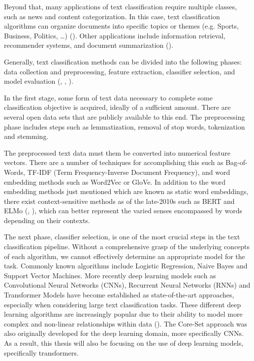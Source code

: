 \documentclass[english,bachelor,ul]{webisthesis} %
\begin{document}
Beyond that, many applications of text classification require multiple classes, such as news and content categorization. In this case, text classification algorithms can organize documents into specific topics or themes (e.g. Sports, Business, Politics, \dots) (\cite{DBLP:journals/csur/Sebastiani02}). Other applications include information retrieval, recommender systems, and document summarization (\cite{DBLP:journals/information/KowsariMHMBB19}).

Generally, text classification methods can be divided into the following phases: data collection and preprocessing, feature extraction, classifier selection, and model evaluation (\cite{DBLP:journals/information/KowsariMHMBB19}, \cite{DBLP:journals/eswa/MironczukP18}, \cite{ikonomakis2005text}).

In the first stage, some form of text data necessary to complete some classification objective is acquired, ideally of a sufficient amount. There are several open data sets that are publicly available to this end. The preprocessing phase includes steps such as lemmatization, removal of stop words, tokenization and stemming. 

The preprocessed text data must them be converted into numerical feature vectors. There are a number of techniques for accomplishing this such as Bag-of-Words, TF-IDF (Term Frequency-Inverse Document Frequency), and word embedding methods such as Word2Vec or GloVe. In addition to the word embedding methods just mentioned which are known as static word embeddings, there exist context-sensitive methods as of the late-2010s such as BERT and ELMo (\cite{DBLP:conf/naacl/DevlinCLT19}, \cite{DBLP:conf/naacl/PetersNIGCLZ18}), which can better represent the varied senses encompassed by words depending on their contexts.

The next phase, classifier selection, is one of the most crucial steps in the text classification pipeline. Without a comprehensive grasp of the underlying concepts of each algorithm, we cannot effectively determine an appropriate model for the task. Commonly known algorithms include Logistic Regression, Naive Bayes and Support Vector Machines. More recently deep learning models such as Convolutional Neural Networks (CNNs), Recurrent Neural Networks (RNNs) and Transformer Models have become established as state-of-the-art approaches, especially when considering large text classification tasks. These different deep learning algorithms are increasingly popular due to their ability to model more complex and non-linear relationships within data (\cite{DBLP:journals/nature/LeCunBH15}). The Core-Set approach was also originally developed for the deep learning domain, more specifically CNNs. As a result, this thesis will also be focusing on the use of deep learning models, specifically transformers.
\end{document}
